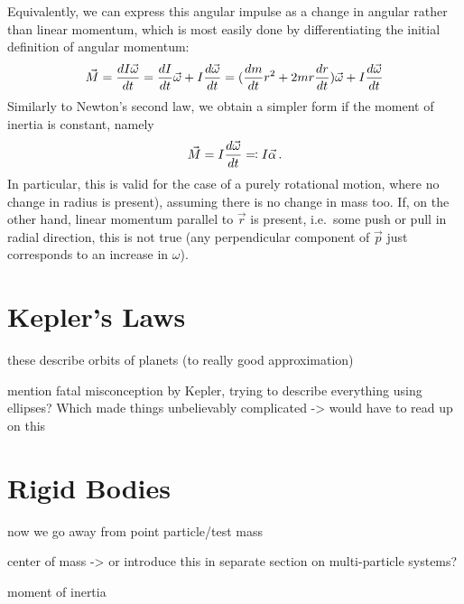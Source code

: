\documentclass[../class_mech_main.tex]{subfiles}
\begin{document}
Equivalently, we can express this angular impulse as a change in angular rather than linear momentum, which is most easily done by differentiating the initial definition of angular momentum:
\begin{align}
	\vec{M} = \dv{I \vec{\omega}}{t} = \dv{I}{t} \vec{\omega} + I \dv{\vec{\omega}}{t}
	= (\dv{m}{t} r^2 + 2 m r \dv{r}{t}) \vec{\omega} + I \dv{\vec{\omega}}{t}
\end{align}
Similarly to Newton's second law, we obtain a simpler form if the moment of inertia is constant, namely
\begin{equation}
	\vec{M} = I \dv{\vec{\omega}}{t} \eqqcolon I \vec{\alpha} \, .
\end{equation}
In particular, this is valid for the case of a purely rotational motion, where no change in radius is present), assuming there is no change in mass too. If, on the other hand, linear momentum parallel to $\vec{r}$ is present, i.e.~some push or pull in radial direction, this is not true (any perpendicular component of $\vec{p}$ just corresponds to an increase in $\omega$).



\newpage



    \section{Kepler's Laws}

these describe orbits of planets (to really good approximation)


mention fatal misconception by Kepler, trying to describe everything using ellipses? Which made things unbelievably complicated -> would have to read up on this



\newpage



    \section{Rigid Bodies}

now we go away from point particle/test mass


center of mass -> or introduce this in separate section on multi-particle systems?

moment of inertia
\end{document}
